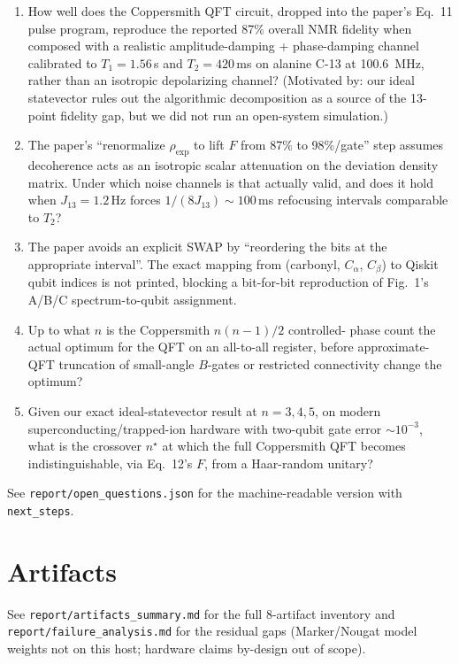 \documentclass[11pt]{article}
\begin{document}
\begin{enumerate}
  \item[Q1.] How well does the Coppersmith QFT circuit, dropped into
        the paper's Eq.~11 pulse program, reproduce the reported
        87\% overall NMR fidelity when composed with a realistic
        amplitude-damping + phase-damping channel calibrated to
        $T_1 = 1.56\,$s and $T_2 = 420\,$ms on alanine C-13 at
        100.6~MHz, rather than an isotropic depolarizing channel?
        (Motivated by: our ideal statevector rules out the algorithmic
        decomposition as a source of the 13-point fidelity gap, but we
        did not run an open-system simulation.)
  \item[Q2.] The paper's ``renormalize $\rho_\text{exp}$ to lift $F$
        from 87\% to 98\%/gate'' step assumes decoherence acts as an
        isotropic scalar attenuation on the deviation density matrix.
        Under which noise channels is that actually valid, and does it
        hold when $J_{13} = 1.2\,$Hz forces $1/(8 J_{13}) \sim
        100\,$ms refocusing intervals comparable to $T_2$?
  \item[Q3.] The paper avoids an explicit SWAP by ``reordering the bits
        at the appropriate interval''. The exact mapping from
        (carbonyl, $C_\alpha$, $C_\beta$) to Qiskit qubit indices is
        not printed, blocking a bit-for-bit reproduction of Fig.~1's
        A/B/C spectrum-to-qubit assignment.
  \item[Q4.] Up to what $n$ is the Coppersmith $n(n-1)/2$ controlled-
        phase count the actual optimum for the QFT on an all-to-all
        register, before approximate-QFT truncation of small-angle
        $B$-gates or restricted connectivity change the optimum?
  \item[Q5.] Given our exact ideal-statevector result at $n=3,4,5$, on
        modern superconducting/trapped-ion hardware with two-qubit gate
        error $\sim 10^{-3}$, what is the crossover $n^\star$ at which
        the full Coppersmith QFT becomes indistinguishable, via
        Eq.~12's $F$, from a Haar-random unitary?
\end{enumerate}

See \texttt{report/open\_questions.json} for the machine-readable
version with \texttt{next\_steps}.

\section{Artifacts}
See \texttt{report/artifacts\_summary.md} for the full 8-artifact
inventory and \texttt{report/failure\_analysis.md} for the residual
gaps (Marker/Nougat model weights not on this host; hardware claims
by-design out of scope).
\end{document}
